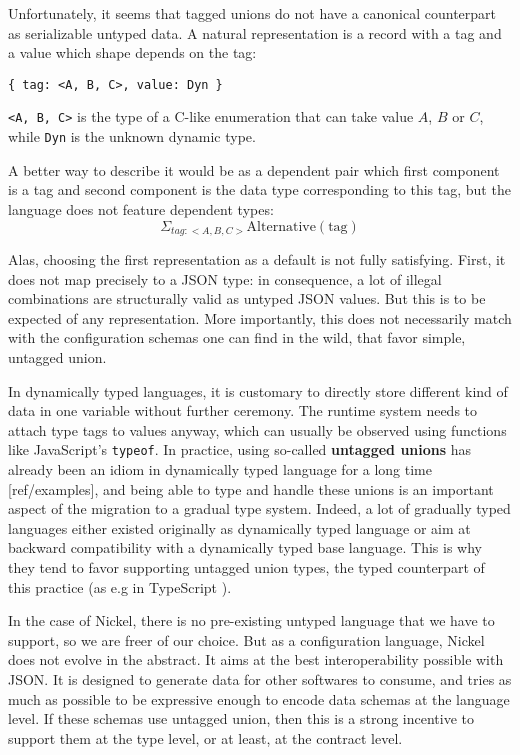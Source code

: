 \documentclass{article}
\begin{document}
Unfortunately, it seems that tagged unions do not have a canonical counterpart
as serializable untyped data. A natural representation is a record with a tag
and a value which shape depends on the tag:

\begin{lstlisting}
{ tag: <A, B, C>, value: Dyn }
\end{lstlisting}

\lstinline+<A, B, C>+ is the type of a C-like enumeration that can take value
$A$, $B$ or $C$, while \lstinline+Dyn+ is the unknown dynamic type.

A better way to describe it would be as a dependent pair which first component
is a tag and second component is the data type corresponding to this tag, but
the language does not feature dependent types:
\[
    \Sigma_{tag : <A, B, C>} \text{Alternative}(\text{tag})
\]

Alas, choosing the first representation as a default is not fully satisfying.
First, it does not map precisely to a JSON type: in consequence, a lot of
illegal combinations are structurally valid as untyped JSON values. But this is
to be expected of any representation. More importantly, this does not
necessarily match with the configuration schemas one can find in the wild, that
favor simple, untagged union.

In dynamically typed languages, it is customary to directly store different kind
of data in one variable without further ceremony. The runtime system needs to
attach type tags to values anyway, which can usually be observed using functions
like JavaScript's \verb+typeof+. In practice, using so-called \textbf{untagged
unions} has already been an idiom in dynamically typed language for a long time
[ref/examples], and being able to type and handle these unions is an important
aspect of the migration to a gradual type system. Indeed, a lot of gradually
typed languages either existed originally as dynamically typed language or aim
at backward compatibility with a dynamically typed base language. This is why
they tend to favor supporting untagged union types, the typed counterpart of
this practice (as e.g in TypeScript \cite{TypeScriptUnions}).

In the case of Nickel, there is no pre-existing untyped language that we have to
support, so we are freer of our choice. But as a configuration language, Nickel
does not evolve in the abstract. It aims at the best interoperability possible
with JSON. It is designed to generate data for other softwares to consume, and
tries as much as possible to be expressive enough to encode data schemas at the
language level. If these schemas use untagged union, then this is a strong
incentive to support them at the type level, or at least, at the contract level.
\end{document}
